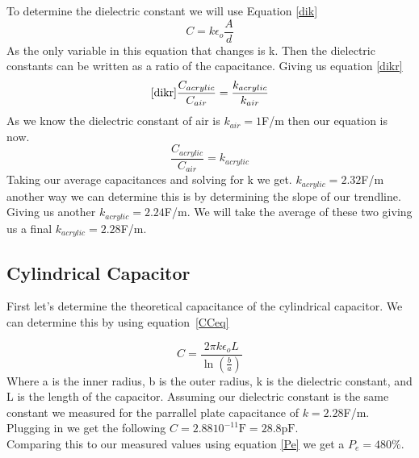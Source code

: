 \documentclass[10pt]{article}
\begin{document}
To determine the dielectric constant we will use Equation \ref*{dik}
\begin{equation}\label{dik}
  C = k\epsilon_{o}\frac{A}{d}
\end{equation}
As the only variable in this equation that changes is k. Then the dielectric constants
can be written as a ratio of the capacitance. Giving us equation \ref*{dikr}
\begin{equation}\ref*{dikr}
  \frac{C_{acrylic}}{C_{air}} = \frac{k_{acrylic}}{k_{air}}
\end{equation}
As we know the dielectric constant of air is $k_{air} = 1$F/m then our equation is now.\\
\begin{equation}
  \frac{C_{acrylic}}{C_{air}} = k_{acrylic}
\end{equation}
Taking our average capacitances and solving for k we get. $k_{acrylic} = 2.32$F/m another way
we can determine this is by determining the slope of our trendline. Giving us another $k_{acrylic} = 2.24$F/m.
We will take the average of these two giving us a final $k_{acrylic} = 2.28$F/m.\\
\subsection*{Cylindrical Capacitor}

First let's determine the theoretical capacitance of the cylindrical capacitor. We can 
determine this by using equation~\ref*{CCeq}

\begin{equation}\label{CCeq}
  C = \frac{2\pi k \epsilon_{o}L}{\ln(\frac{b}{a})}
\end{equation}
Where a is the inner radius, b is the outer radius, k is the dielectric constant, and L is the length of the capacitor. 
Assuming our dielectric constant is the same constant we measured for the parrallel plate capacitance of $k = 2.28$F/m.
Plugging in we get the following $C = 2.88 10^{-11}\text{F} = 28.8\text{pF}$.\\
Comparing this to our measured values using equation \ref*{Pe} we get a $P_{e} = 480\%$.\\
\end{document}
